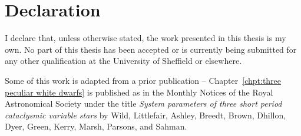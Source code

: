 \chapter*{Declaration}
\label{chpt:declaration}
I declare that, unless otherwise stated, the work presented in this thesis is my own.
No part of this thesis has been accepted or is currently being submitted for any other qualification at the University of Sheffield or elsewhere.

Some of this work is adapted from a prior publication -- Chapter~\ref{chpt:three peculiar white dwarfs} is published as \cite{wild2021} in the Monthly Notices of the Royal Astronomical Society under the title \textit{System parameters of three short period cataclysmic variable stars} by Wild, Littlefair, Ashley, Breedt, Brown, Dhillon, Dyer, Green, Kerry, Marsh, Parsons, and Sahman.